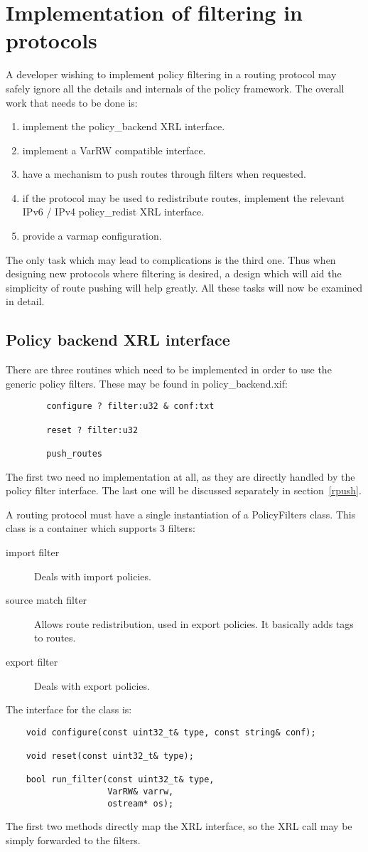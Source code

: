 \documentclass{article}
\begin{document}
\section{Implementation of filtering in protocols}
A developer wishing to implement policy filtering in a routing protocol may
safely ignore all the details and internals of the policy framework. The overall
work that needs to be done is:
\begin{enumerate}
\item implement the policy\_backend XRL interface.
\item implement a VarRW compatible interface.
\item have a mechanism to push routes through filters when requested.
\item if the protocol may be used to redistribute routes, implement the relevant
IPv6 / IPv4 policy\_redist XRL interface.
\item provide a varmap configuration.
\end{enumerate}
The only task which may lead to complications is the third one. Thus when
designing new protocols where filtering is desired, a design which will aid the
simplicity of route pushing will help greatly.  All these tasks will now be
examined in detail.

\subsection{Policy backend XRL interface}
There are three routines which need to be implemented in order to use the
generic policy filters. These may be found in policy\_backend.xif:
\begin{verbatim}
        configure ? filter:u32 & conf:txt
	
        reset ? filter:u32

        push_routes
\end{verbatim}
The first two need no implementation at all, as they are directly handled by the
policy filter interface. The last one will be discussed separately in
section~\ref{rpush}.

A routing protocol must have a single instantiation of a PolicyFilters class.
This class is a container which supports 3 filters:
\begin{description}
\item[import filter] Deals with import policies.
\item[source match filter] Allows route redistribution, used in export
policies. It basically adds tags to routes.
\item[export filter] Deals with export policies.
\end{description}
The interface for the class is:
\begin{verbatim}
    void configure(const uint32_t& type, const string& conf);
    
    void reset(const uint32_t& type);
    
    bool run_filter(const uint32_t& type, 
                    VarRW& varrw, 
                    ostream* os);
\end{verbatim}
The first two methods directly map the XRL interface, so the XRL call may be
simply forwarded to the filters.
\end{document}
